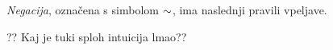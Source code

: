 \begin{definicija}
    \emph{Negacija}, označena s simbolom $\negacija$, ima naslednji pravili vpeljave.
    \begin{center}
        \begin{bprooftree}
        \end{bprooftree}
        \begin{bprooftree}
        \end{bprooftree}
    \end{center}
    ?? Kaj je tuki sploh intuicija lmao??
\end{definicija}
